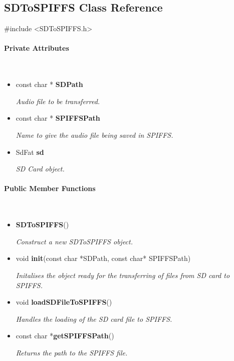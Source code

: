\subsection{SDToSPIFFS Class Reference}
\label{subsec:sdtospiffs}\mbox{}

    \ttfamily{}

    \#include <SDToSPIFFS.h>\\

    \rmfamily{}

    \paragraph{Private Attributes}\mbox{}\\

        \begin{itemize}
            \item const char * \textbf{SDPath}
            
                \quad \quad \textit{Audio file to be transferred.}

            \item const char * \textbf{SPIFFSPath}
            
                \quad \quad \textit{Name to give the audio file being saved in SPIFFS.}

            \item SdFat \textbf{sd}
            
                \quad \quad \textit{SD Card object.}\\

        \end{itemize}


    \paragraph{Public Member Functions}\mbox{}\\

        \begin{itemize}
            \item \textbf{SDToSPIFFS}() 
            
                \quad \quad \textit{Construct a new SDToSPIFFS object.}

            \item void \textbf{init}(const char *SDPath, const char* SPIFFSPath) 
            
                \quad \quad \textit{Initalises the object ready for the transferring of files from SD card to SPIFFS.}

            \item void \textbf{loadSDFileToSPIFFS}() 
            
                \quad \quad \textit{Handles the loading of the SD card file to SPIFFS.}

            \item const char *\textbf{getSPIFFSPath}() 
            
                \quad \quad \textit{Returns the path to the SPIFFS file.}\\
        \end{itemize}

